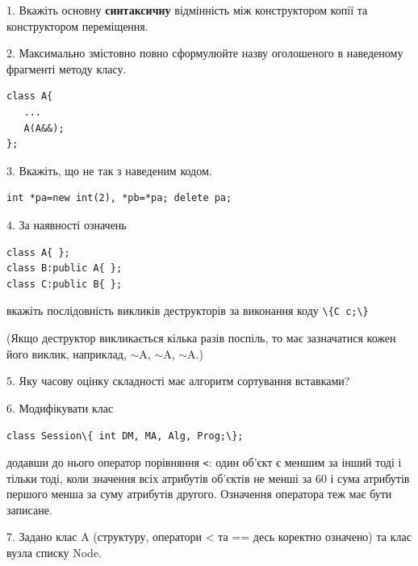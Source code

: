 \documentclass[12pt, ukrainian]{article}
\def\code#1{\Verb!#1!}
\begin{document}
{%
1. Вкажіть основну \textbf{синтаксичну} відмінність між конструктором копії та конструктором переміщення.%
\par
\vspace{2mm}
2. Максимально змістовно повно сформулюйте назву оголошеного в наведеному фрагменті методу класу.
\vspace{-3mm}
\begin{verbatim}class A{
   ...
   A(A&&);
};\end{verbatim}
\vspace{-3mm}
\par
\vspace{2mm}
3. Вкажіть, що не так з наведеним кодом.
\vspace{-3mm}
\begin{verbatim}int *pa=new int(2), *pb=*pa; delete pa;\end{verbatim}
\vspace{-3mm}
\par
\vspace{2mm}
4. За наявності означень
\vspace{-3mm}
\begin{verbatim}
class A{ };
class B:public A{ };
class C:public B{ };\end{verbatim}
\vspace{-3mm}
вкажіть послідовність викликів деструкторів за виконання коду \code{\{C c;\}} 

(Якщо деструктор викликається кілька разів поспіль, то має зазначатися кожен його виклик, наприклад, $\sim$A, $\sim$A, $\sim$A.)

\vspace{2mm}
5. Яку часову оцінку складності має алгоритм сортування вставками?
\par
\vspace{2mm}
6. Модифікувати клас 

\qquad\code{class Session\{ int DM, MA, Alg, Prog;\};} 


додавши до нього оператор порівняння \code{<}: один об'єкт є меншим за інший тоді і тільки тоді, коли значення всіх атрибутів об'єктів не менші за 60 і сума атрибутів першого менша за суму атрибутів другого. Означення оператора теж має бути записане.%
\par
\vspace{2mm}
7. 
Задано клас A (структуру, оператори < та == десь коректно означено) та клас вузла списку Node.

}
\end{document}
